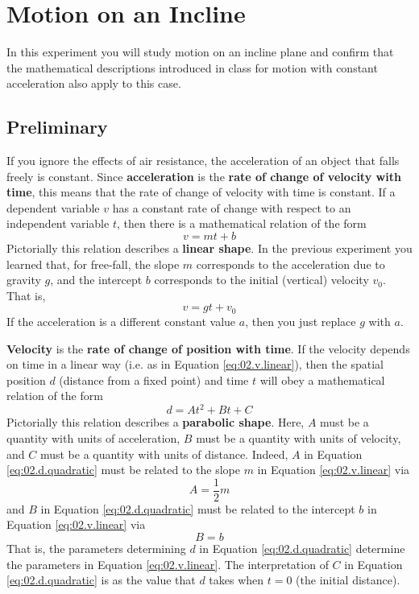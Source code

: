 \setcounter{chapter}{1}
\chapter{Motion on an Incline}
%
In this experiment you will study motion on an incline plane and confirm that the mathematical descriptions introduced in class for motion with constant acceleration also apply to this case.
%
\section{Preliminary}
%
If you ignore the effects of air resistance, the acceleration of an object that falls freely is constant. Since \textbf{acceleration} is the \textbf{rate of change of velocity with time}, this means that the rate of change of velocity with time is constant. If a dependent variable $v$ has a constant rate of change with respect to an independent variable $t$, then there is a mathematical relation of the form
\begin{equation}
    v = m t + b
    \label{eq:02.v.linear}
\end{equation}
Pictorially this relation describes a \textbf{linear shape}. In the previous experiment you learned that, for free-fall, the slope $m$ corresponds to the acceleration due to gravity $g$, and the intercept $b$ corresponds to the initial (vertical) velocity $v_{0}$. That is,
\begin{equation}
    v = g t + v_{0}
\end{equation}
If the acceleration is a different constant value $a$, then you just replace $g$ with $a$.

\textbf{Velocity} is the \textbf{rate of change of position with time}. If the velocity depends on time in a linear way (i.e. as in Equation \ref{eq:02.v.linear}), then the spatial position $d$ (distance from a fixed point) and time $t$ will obey a mathematical relation of the form
\begin{equation}
    d = A t^{2} + B t + C
    \label{eq:02.d.quadratic}
\end{equation}
Pictorially this relation describes a \textbf{parabolic shape}. Here, $A$ must be a quantity with units of acceleration, $B$ must be a quantity with units of velocity, and $C$ must be a quantity with units of distance. Indeed, $A$ in Equation \ref{eq:02.d.quadratic} must be related to the slope $m$ in Equation \ref{eq:02.v.linear} via
\begin{equation}
    A = \frac{1}{2} m
\end{equation}
and $B$ in Equation \ref{eq:02.d.quadratic} must be related to the intercept $b$ in Equation \ref{eq:02.v.linear} via
\begin{equation}
    B = b
\end{equation}
That is, the parameters determining $d$ in Equation \ref{eq:02.d.quadratic} determine the parameters in Equation \ref{eq:02.v.linear}. The interpretation of $C$ in Equation \ref{eq:02.d.quadratic} is as the value that $d$ takes when $t = 0$ (the initial distance).

